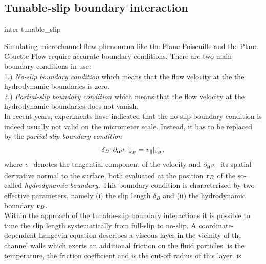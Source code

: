 \subsection{Tunable-slip boundary interaction}
\begin{essyntax}
  inter  
  tunable_slip    
    
  \begin{features}
  \end{features}
\end{essyntax}
Simulating microchannel flow phenomena like the Plane Poiseuille and the Plane
Couette Flow require accurate boundary conditions. There are two main
boundary conditions in use:\\
1.) {\em No-slip boundary condition} which means that the flow velocity at the
the hydrodynamic boundaries is zero.\\
2.) {\em Partial-slip boundary condition} which means that the flow velocity
at the hydrodynamic boundaries does not vanish.\\
In recent years, experiments have indicated that
the no-slip boundary condition is indeed usually not valid on the micrometer
scale. Instead, it has to be replaced by the {\em {partial-slip
boundary condition}}
\begin{displaymath}
\delta_B \: \: \partial_{{\bf n}} v_{\parallel}|_{{\bf r}_B} =
v_{\parallel}|_{{\bf r}_B},
\end{displaymath}
where $v_{\parallel}$ denotes the tangential component of the velocity and
$\partial_{{\bf n}} v_{\parallel}$ its spatial derivative normal to the surface, both
evaluated at the position ${\bf r}_B$ of the so-called {\em hydrodynamic boundary}.
This boundary condition is characterized by two effective parameters, namely
(i) the slip length $\delta_B$ and (ii) the hydrodynamic
boundary ${\bf r}_B$.\\
Within the approach of the tunable-slip boundary interactions it is possible
to tune the slip length systematically from full-slip to no-slip.
A coordinate-dependent Langevin-equation describes a viscous layer in the
vicinity of the channel walls which exerts an additional friction on the fluid
particles.
 is the temperature,  the friction coefficient and
 is the cut-off radius of this layer.  is
